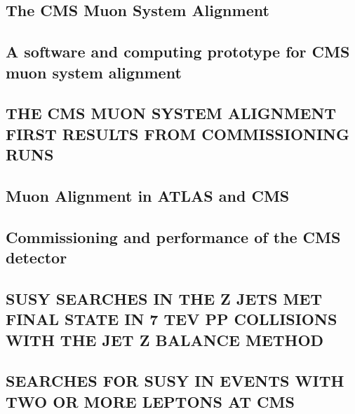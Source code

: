 \documentclass[a4paper, 11pt, twoside, openright]{report}
\begin{document}
\subsection{The CMS Muon System Alignment}

\subsection{A software and computing prototype for CMS muon system alignment}

\subsection{THE CMS MUON SYSTEM ALIGNMENT FIRST RESULTS FROM COMMISSIONING RUNS}

\subsection{Muon Alignment in ATLAS and CMS}

\subsection{Commissioning and performance of the CMS detector}

\subsection{SUSY SEARCHES IN THE Z JETS MET FINAL STATE IN 7 TEV PP COLLISIONS WITH THE JET Z BALANCE METHOD}

\subsection{SEARCHES FOR SUSY IN EVENTS WITH TWO OR MORE LEPTONS AT CMS}

\end{document}
